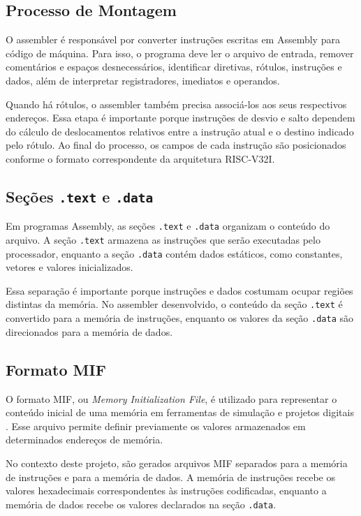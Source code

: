 \documentclass[conference]{IEEEtran}
\begin{document}
\subsection{Processo de Montagem}

O assembler é responsável por converter instruções escritas em Assembly para código de máquina. Para isso, o programa deve ler o arquivo de entrada, remover comentários e espaços desnecessários, identificar diretivas, rótulos, instruções e dados, além de interpretar registradores, imediatos e operandos.

Quando há rótulos, o assembler também precisa associá-los aos seus respectivos endereços. Essa etapa é importante porque instruções de desvio e salto dependem do cálculo de deslocamentos relativos entre a instrução atual e o destino indicado pelo rótulo. Ao final do processo, os campos de cada instrução são posicionados conforme o formato correspondente da arquitetura RISC-V32I.

\subsection{Seções \texttt{.text} e \texttt{.data}}

Em programas Assembly, as seções \texttt{.text} e \texttt{.data} organizam o conteúdo do arquivo. A seção \texttt{.text} armazena as instruções que serão executadas pelo processador, enquanto a seção \texttt{.data} contém dados estáticos, como constantes, vetores e valores inicializados.

Essa separação é importante porque instruções e dados costumam ocupar regiões distintas da memória. No assembler desenvolvido, o conteúdo da seção \texttt{.text} é convertido para a memória de instruções, enquanto os valores da seção \texttt{.data} são direcionados para a memória de dados.

\subsection{Formato MIF}

O formato MIF, ou \textit{Memory Initialization File}, é utilizado para representar o conteúdo inicial de uma memória em ferramentas de simulação e projetos digitais \cite{mif}. Esse arquivo permite definir previamente os valores armazenados em determinados endereços de memória.

No contexto deste projeto, são gerados arquivos MIF separados para a memória de instruções e para a memória de dados. A memória de instruções recebe os valores hexadecimais correspondentes às instruções codificadas, enquanto a memória de dados recebe os valores declarados na seção \texttt{.data}.
\end{document}
